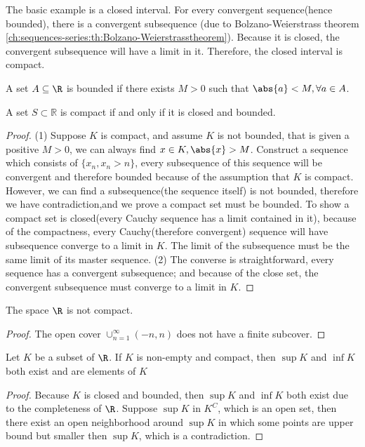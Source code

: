 \begin{refsection}
\begin{example}
The basic example is a closed interval. For every convergent sequence(hence bounded), there is a convergent subsequence (due to Bolzano-Weierstrass theorem \autoref{ch:sequences-series:th:Bolzano-Weierstrasstheorem}). Because it is closed, the convergent subsequence will have a limit in it. Therefore, the closed interval is compact.
\end{example}

\begin{definition}
A set $A\subseteq \R$ is bounded if there exists $M>0$ such that $\abs{a} < M,\forall a\in A$.
\end{definition}

\begin{theorem}
\cite[96]{abbott2001understanding}A set $S \subset \mathbb{R}$ is compact if and only if it is closed and bounded. 
\end{theorem}
\begin{proof}
(1) Suppose $K$ is compact, and assume $K$ is not bounded, that is given a positive $M>0$, we can always find $x\in K, \abs{x} > M$. Construct a sequence which consists of $\{x_n,x_n > n\}$, every subsequence of this sequence will be convergent and therefore bounded because of the assumption that $K$ is compact. However, we can find a subsequence(the sequence itself) is not bounded, therefore we have contradiction,and we prove a compact set must be bounded. 
To show a compact set is closed(every Cauchy sequence has a limit contained in it), because of the compactness, every Cauchy(therefore convergent) sequence will have subsequence converge to a limit in $K$. The limit of the subsequence must be the same limit of its master sequence. 
(2) The converse is straightforward, every sequence has a convergent subsequence; and because of the close set, the convergent subsequence must converge to a limit in $K$.	
\end{proof}




\begin{lemma}[compactness of $\R$]
\cite[145]{johnsonbaugh2010foundations} The space $\R$ is not compact.
\end{lemma}
\begin{proof}
The open cover $\cup_{n=1}^{\infty} (-n,n)$ does not have a finite subcover.	
\end{proof}



\begin{lemma}
\cite[99]{abbott2001understanding}Let $K$ be a subset of $\R$. If $K$ is non-empty and compact, then $\sup K$ and $\inf K$ both exist and are elements of $K$ 
\end{lemma}
\begin{proof}
Because $K$ is closed and bounded, then $\sup K$ and $\inf K$ both exist due to the completeness of $\R$. Suppose $\sup K$ in $K^C$, which is an open set, then there exist an open neighborhood around $\sup K$ in which some points are upper bound but smaller then $\sup K$, which is a contradiction.	
\end{proof}



\end{refsection}
